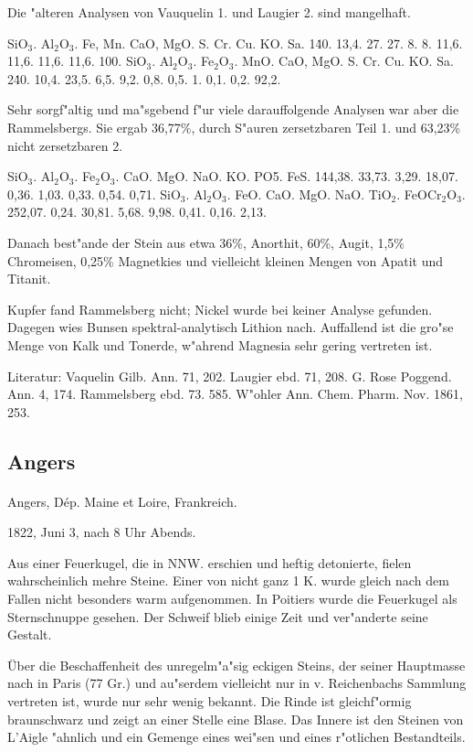 \documentclass[a4paper, 11pt, oneside]{article}
\begin{document}
Die "alteren Analysen von Vauquelin 1. und Laugier 2. sind mangelhaft.

SiO$_{3}$. Al$_{2}$O$_{3}$. Fe, Mn. CaO, MgO. S. Cr. Cu. KO. Sa.  
1\. 40. 13,4. 27. 27. 8. 8. 11,6. 11,6. 11,6. 11,6. 100.  
SiO$_{3}$. Al$_{2}$O$_{3}$. Fe$_{2}$O$_{3}$. MnO. CaO, MgO. S. Cr. Cu. KO. Sa.  
2\. 40. 10,4. 23,5. 6,5. 9,2. 0,8. 0,5. 1. 0,1. 0,2. 92,2.

Sehr sorgf"altig und ma"sgebend f"ur viele darauffolgende Analysen war aber die Rammelsbergs. Sie ergab 36,77\%, durch S"auren zersetzbaren Teil 1. und 63,23\% nicht zersetzbaren 2.

SiO$_{3}$. Al$_{2}$O$_{3}$. Fe$_{2}$O$_{3}$. CaO. MgO. NaO. KO. PO5. FeS.  
1\. 44,38. 33,73. 3,29. 18,07. 0,36. 1,03. 0,33. 0,54. 0,71.  
SiO$_{3}$. Al$_{2}$O$_{3}$. FeO. CaO. MgO. NaO. TiO$_{2}$. FeOCr$_{2}$O$_{3}$.  
2\. 52,07. 0,24. 30,81. 5,68. 9,98. 0,41. 0,16. 2,13.

Danach best"ande der Stein aus etwa  
36\%, Anorthit,  
60\%, Augit,  
1,5\% Chromeisen,  
0,25\% Magnetkies  
und vielleicht kleinen Mengen von Apatit und Titanit.

Kupfer fand Rammelsberg nicht; Nickel wurde bei keiner Analyse gefunden. Dagegen wies Bunsen spektral-analytisch Lithion nach. Auffallend ist die gro"se Menge von Kalk und Tonerde, w"ahrend Magnesia sehr gering vertreten ist.

Literatur: Vaquelin Gilb. Ann. 71, 202. Laugier ebd. 71, 208. G. Rose Poggend. Ann. 4, 174. Rammelsberg ebd. 73. 585. W"ohler Ann. Chem. Pharm. Nov. 1861, 253.

\subsection{Angers}
\normalsize
\paragraph{}
Angers, Dép. Maine et Loire, Frankreich.

1822, Juni 3, nach 8 Uhr Abends.

Aus einer Feuerkugel, die in NNW. erschien und heftig detonierte, fielen wahrscheinlich mehre Steine. Einer von nicht ganz 1 K. wurde gleich nach dem Fallen nicht besonders warm aufgenommen. In Poitiers wurde die Feuerkugel als Sternschnuppe gesehen. Der Schweif blieb einige Zeit und ver"anderte seine Gestalt.

Über die Beschaffenheit des unregelm"a"sig eckigen Steins, der seiner Hauptmasse nach in Paris (77 Gr.) und au"serdem vielleicht nur in v. Reichenbachs Sammlung vertreten ist, wurde nur sehr wenig bekannt. Die Rinde ist gleichf"ormig braunschwarz und zeigt an einer Stelle eine Blase. Das Innere ist den Steinen von L'Aigle "ahnlich und ein Gemenge eines wei"sen und eines r"otlichen Bestandteils.
\end{document}
